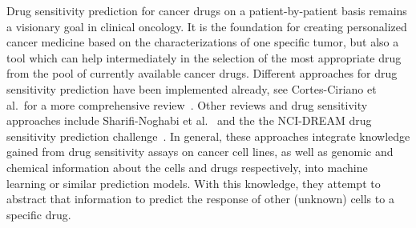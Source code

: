 Drug sensitivity prediction for cancer drugs on a patient-by-patient basis remains a visionary goal in clinical oncology.
It is the foundation for creating personalized cancer medicine based on the characterizations of one specific tumor, but also a tool which can help intermediately in the selection of the most appropriate drug from the pool of currently available cancer drugs.
Different approaches for drug sensitivity prediction have been implemented already, see Cortes-Ciriano et al.\ for a more comprehensive review~\cite{current_trends_in_drug_sensitivity_prediction}. Other reviews and drug sensitivity approaches include Sharifi-Noghabi et al.~\cite{drug_sensitivity_prediction_guidelines} and the the NCI-DREAM drug sensitivity prediction challenge~\cite{community_effort_drug_sensitivity_prediction}. In general, these approaches integrate knowledge gained from drug sensitivity assays on cancer cell lines, as well as genomic and chemical information about the cells and drugs respectively, into machine learning or similar prediction models. With this knowledge, they attempt to abstract that information to predict the response of other (unknown) cells to a specific drug.

